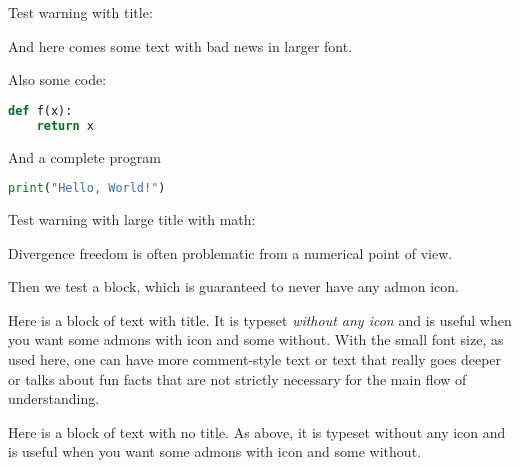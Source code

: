 \documentclass[%
oneside,                 %
final,                   %
10pt]{article}
\newenvironment{warning_mdfboxadmon}[1][]{
\begin{warning_mdfboxmdframed}[frametitle=#1]
}
{
\end{warning_mdfboxmdframed}
}
\newenvironment{block_mdfboxadmon}[1][]{
\begin{block_mdfboxmdframed}[frametitle=#1]
}
{
\end{block_mdfboxmdframed}
}
\begin{document}
Test warning with title:


\begin{warning_mdfboxadmon}
{\large And here comes some text with bad news in larger font.

Also some code:

\begin{lstlisting}[language=Python,style=simple,xleftmargin=2mm]
def f(x):
    return x
\end{lstlisting}
And a complete program

\begin{lstlisting}[language=Python,style=simple,xleftmargin=2mm]
print("Hello, World!")
\end{lstlisting}
\par}
\end{warning_mdfboxadmon} %



Test warning with large title with math:


\begin{warning_mdfboxadmon}[{\large Watch out for $\nabla\cdot\bm{u}=0$ equations}.]
{\large Divergence freedom is often problematic from a numerical point
of view.
\par}
\end{warning_mdfboxadmon} %



Then we test a block, which is guaranteed to never have any admon icon.


\begin{block_mdfboxadmon}
\vspace{0.5mm}\par\noindent
{\footnotesize Here is a block of text with title. It is typeset
\emph{without any icon} and is useful when you want some admons with icon
and some without. With the small font size, as used here, one can have
more comment-style text or text that really goes deeper or talks
about fun facts that are not strictly necessary for the main flow
of understanding.
\par}
\end{block_mdfboxadmon} %




\begin{block_mdfboxadmon}[]
Here is a block of text with no title. As above, it is typeset without any icon
and is useful when you want some admons with icon and some without.
\end{block_mdfboxadmon} %
\end{document}
